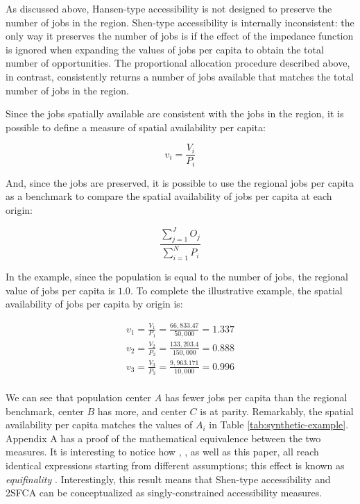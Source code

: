 \documentclass[]{elsarticle} %
\begin{document}
As discussed above, Hansen-type accessibility is not designed to
preserve the number of jobs in the region. Shen-type accessibility is
internally inconsistent: the only way it preserves the number of jobs is
if the effect of the impedance function is ignored when expanding the
values of jobs per capita to obtain the total number of opportunities.
The proportional allocation procedure described above, in contrast,
consistently returns a number of jobs available that matches the total
number of jobs in the region.

Since the jobs spatially available are consistent with the jobs in the
region, it is possible to define a measure of spatial availability per
capita:

\begin{equation}
\label{eq:SA-per-capita}
v_i = \frac{V_i}{P_i}
\end{equation}

And, since the jobs are preserved, it is possible to use the regional
jobs per capita as a benchmark to compare the spatial availability of
jobs per capita at each origin:

\begin{equation}
\label{eq:Regional-jobs-per-capita}
\frac{\sum_{j=1}^J O_j}{\sum_{i=1}^N P_i}
\end{equation}

In the example, since the population is equal to the number of jobs, the
regional value of jobs per capita is \(1.0\). To complete the
illustrative example, the spatial availability of jobs per capita by
origin is:

\begin{equation}
\label{eq:SA-per-capita-2populations}
\begin{array}{l}
v_{1} = \frac{V_1}{P_1} =  \frac{66,833.47}{50,000} = 1.337\\
v_{2} =  \frac{V_{2}}{P_2} =  \frac{133,203.4}{150,000} = 0.888\\
v_{3} =  \frac{V_{3}}{P_3} =  \frac{9,963.171}{10,000} = 0.996\\
\end{array}
\end{equation}

We can see that population center \(A\) has fewer jobs per capita than
the regional benchmark, center \(B\) has more, and center \(C\) is at
parity. Remarkably, the spatial availability per capita matches the
values of \(A_i\) in Table \ref{tab:synthetic-example}. Appendix A has a
proof of the mathematical equivalence between the two measures. It is
interesting to notice how \citet{weibull_axiomatic_1976},
\citet{shen1998}, as well as this paper, all reach identical expressions
starting from different assumptions; this effect is known as
\emph{equifinality}
\citetext{\citealp[see][p.~333]{ortuzar_2011_modelling}; \citealp[and][]{williams_hall_1981}}.
Interestingly, this result means that Shen-type accessibility and 2SFCA
can be conceptualized as singly-constrained accessibility measures.
\end{document}
